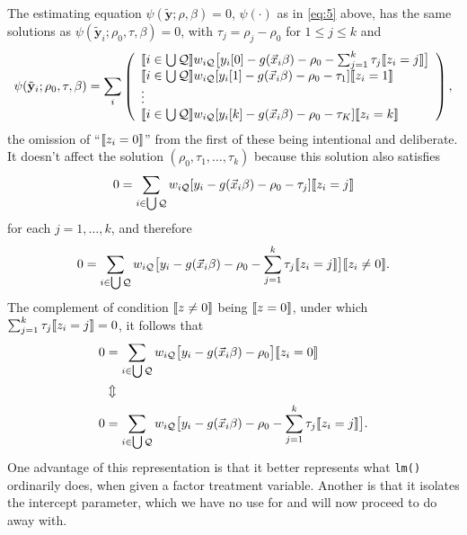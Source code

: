 \documentclass{article}
\DeclarePairedDelimiter{\indicator}{\llbracket}{\rrbracket}
\begin{document}
The estimating equation $\psi(\tilde{\mathbf{y}}; \rho, \beta)=0$,
$\psi(\cdot)$ as in \eqref{eq:5} above, has the same solutions as $\psi(\tilde{\mathbf{y}}_{i};
  \rho_{0}, \tau, \beta)=0$, with $\tau_{j}=\rho_{j}-\rho_{0}$ for
$1\leq j \leq k$ and
\begin{equation*}
         \psi(\tilde{\mathbf{y}}_{i};
  \rho_{0}, \tau, \beta) =
         \sum_{i}\left( \begin{array}{l}
           \indicator{i \in \bigcup \mathcal{Q}}w_{i\mathcal{Q}}\big[y_{i}[0] - g(\vec{x}_{i}\beta)-
                  \rho_{0} - \sum_{j=1}^{k}\tau_{j}\indicator{z_{i}=j}\big]\\
           \indicator{i \in \bigcup \mathcal{Q}}w_{i\mathcal{Q}}[y_{i}[1] - g(\vec{x}_{i}\beta)-
                  \rho_{0}-\tau_{1}]\indicator{z_{i}=1}\\
                  \vdots \\
           \indicator{i \in \bigcup \mathcal{Q}}w_{i\mathcal{Q}}[y_{i}[k] - g(\vec{x}_{i}\beta)-
                 \rho_{0} - \tau_{K}]\indicator{z_{i}=k}\\                  
                \end{array}\right), 
\end{equation*}
the omission of ``$\indicator{z_{i}=0}$'' from the first of these
being intentional and deliberate. It doesn't affect the solution
$(\rho_{0}, \tau_{1}, \ldots, \tau_{k})$
because this solution also satisfies
\begin{equation*}
       0 = \sum_{i \in \bigcup \mathcal{Q}}w_{i\mathcal{Q}}[y_{i} - g(\vec{x}_{i}\beta)-
                  \rho_{0}-\tau_{j}]\indicator{z_{i}=j}
\end{equation*}
for each $j=1, \ldots, k$, and therefore
\begin{equation*}
       0 = \sum_{i \in \bigcup \mathcal{Q}}w_{i\mathcal{Q}}\big[y_{i} - g(\vec{x}_{i}\beta)-
                  \rho_{0}-\sum_{j=1}^{k}\tau_{j}\indicator{z_{i}=j}\big]\indicator{z_{i}
                  \neq 0}.
\end{equation*}
The complement of condition $\indicator{z\neq 0}$ being
$\indicator{z=0}$, under which $\sum_{j=1}^{k}\tau_{j}\indicator{z_{i}=j}=0$, it follows that
\begin{align*}
         0 &= \sum_{i \in \bigcup \mathcal{Q}}w_{i\mathcal{Q}}\big[y_{i} - g(\vec{x}_{i}\beta)-
                  \rho_{0}\big]\indicator{z_{i}
             =0}\\
           & \Updownarrow \\
         0 &= \sum_{i \in \bigcup \mathcal{Q}}w_{i\mathcal{Q}}\big[y_{i} - g(\vec{x}_{i}\beta)-
                  \rho_{0} - \sum_{j=1}^{k}\tau_{j}\indicator{z_{i}=j}\big].
\end{align*}
One advantage of this representation is that it better represents what
\texttt{lm()} ordinarily does, when given a factor treatment
variable.  Another is that it isolates the intercept parameter, which
we have no use for and will now proceed to do away with. 
\end{document}
